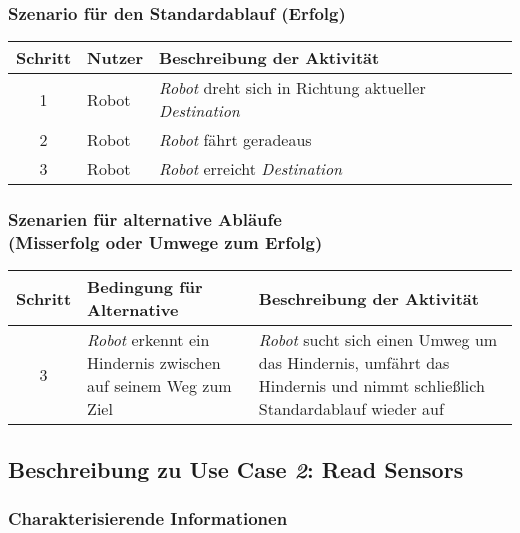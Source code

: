 \documentclass[includeheaders]{scrartcl}
\begin{document}
			\subsubsection*{Szenario für den Standardablauf (Erfolg)}

			\begin{table}[H]
				\centering
				\begin{tabularx}{\textwidth}{@{}cp{2cm}X@{}}
				\toprule
				Schritt & Nutzer & Beschreibung der Aktivität \\ \midrule
				1 & Robot & \emph{Robot} dreht sich in Richtung aktueller \emph{Destination} \\
				2 & Robot & \emph{Robot} fährt geradeaus \\
				3 & Robot & \emph{Robot} erreicht \emph{Destination} \\
				\bottomrule
				\end{tabularx}
			\end{table}
			
			\subsubsection*{Szenarien für alternative Abläufe\\ (Misserfolg oder Umwege zum Erfolg)}

			\begin{table}[H]
				\centering
				\begin{tabularx}{\textwidth}{@{}cp{6cm}X@{}}
				\toprule
				Schritt & Bedingung für Alternative & Beschreibung der Aktivität \\ \midrule
				3 & \emph{Robot} erkennt ein Hindernis zwischen auf seinem Weg zum Ziel & \emph{Robot} sucht sich einen Umweg um das Hindernis, umfährt das Hindernis und nimmt schließlich Standardablauf wieder auf \\
				\bottomrule
				\end{tabularx}
			\end{table}


		\subsection{Beschreibung zu Use Case \emph{2}: Read Sensors}

			\subsubsection*{Charakterisierende Informationen}
\end{document}

